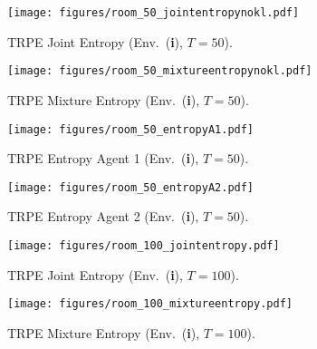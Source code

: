 \begin{figure*}[]
    \centering
    
    \vfill
    \begin{subfigure}[b]{0.245\textwidth}
        \texttt{[image: figures/room\_50\_jointentropynokl.pdf]}
        \caption{\centering TRPE Joint Entropy (Env.~(\textbf{i}), $T=50$).}
        \label{subfig:imagea1}
    \end{subfigure}
    \hfill
    \begin{subfigure}[b]{0.245\textwidth}
        \texttt{[image: figures/room\_50\_mixtureentropynokl.pdf]}
        \caption{\centering TRPE Mixture Entropy (Env.~(\textbf{i}), $T=50$).}
        \label{subfig:imagea2}
    \end{subfigure}
    \hfill
    \begin{subfigure}[b]{0.245\textwidth}
        \centering
        \texttt{[image: figures/room\_50\_entropyA1.pdf]}
        \caption{\centering TRPE Entropy Agent 1 (Env.~(\textbf{i}), $T=50$).}
        \label{subfig:image11}
    \end{subfigure}
    \hfill
    \begin{subfigure}[b]{0.245\textwidth}
        \centering
        \texttt{[image: figures/room\_50\_entropyA2.pdf]}
        \caption{\centering TRPE Entropy Agent 2 (Env.~(\textbf{i}), $T=50$).}
        \label{subfig:image11}
    \end{subfigure}
    \vfill
    \begin{subfigure}[b]{0.245\textwidth}
        \texttt{[image: figures/room\_100\_jointentropy.pdf]}
        \caption{\centering TRPE Joint Entropy (Env.~(\textbf{i}), $T=100$).}
        \label{subfig:imagea1}
    \end{subfigure}
    \hfill
    \begin{subfigure}[b]{0.245\textwidth}
        \texttt{[image: figures/room\_100\_mixtureentropy.pdf]}
        \caption{\centering TRPE Mixture Entropy (Env.~(\textbf{i}), $T=100$).}
        \label{subfig:imagea2}
    \end{subfigure}

\end{figure*}
